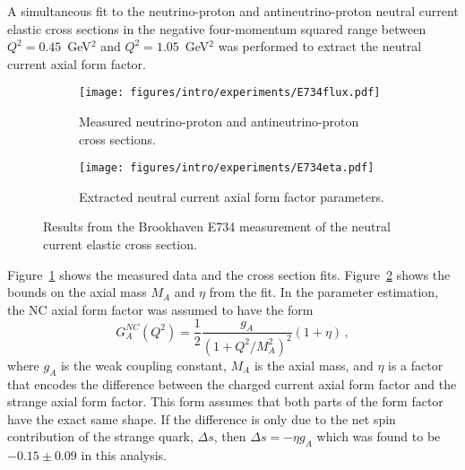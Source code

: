     A simultaneous fit to the neutrino-proton and antineutrino-proton neutral
    current elastic cross sections in the negative four-momentum squared range
    between $Q^2 = 0.45$~GeV$^2$ and $Q^2 = 1.05$~GeV$^2$ was performed to
    extract the neutral current axial form factor.
    \begin{figure}[h]
      \centering
      \begin{subfigure}[t]{2.5in}
        \texttt{[image: figures/intro/experiments/E734flux.pdf]}
        \caption{Measured neutrino-proton and antineutrino-proton cross sections.}
        \label{fig:e734xsec}
      \end{subfigure}
      \hspace{2pt}
      \begin{subfigure}[t]{2.5in}
        \texttt{[image: figures/intro/experiments/E734eta.pdf]}
        \caption{Extracted neutral current axial form factor parameters.}
        \label{fig:e734eta}
      \end{subfigure}
      \caption{Results from the Brookhaven E734 measurement of the neutral
      current elastic cross section.}
      \label{fig:e734results}
    \end{figure}
    Figure~\ref{fig:e734xsec} shows the measured data and the cross section
    fits. Figure~\ref{fig:e734eta} shows the bounds on the axial mass $M_A$ and
    $\eta$ from the fit. In the parameter estimation, the NC axial form factor
    was assumed to have the form
    \begin{equation}\label{eq:axdipole}
      G_A^{NC}(Q^2) = \frac{1}{2}\frac{g_A}{(1+Q^2/M_A^2)^2}(1+\eta) \,,
    \end{equation}
    where $g_A$ is the weak coupling constant, $M_A$ is the axial mass, and
    $\eta$ is a factor that encodes the difference between the charged current
    axial form factor and the strange axial form factor. This form assumes that
    both parts of the form factor have the exact same shape. If the difference
    is only due to the net spin contribution of the strange quark, $\Delta s$,
    then $\Delta s = -\eta g_A$ which was found to be $-0.15 \pm 0.09$ in this
    analysis.

